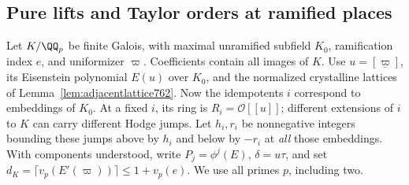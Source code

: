 \documentclass[a4paper,11pt]{article}
\theoremstyle{definition}
\theoremstyle{remark}
\numberwithin{equation}{section}
\begin{document}
\subsection{Pure lifts and Taylor orders at ramified places}
\label{sec:ramifiedorders782}
Let \(K/\QQ_p\) be finite Galois, with maximal unramified
subfield \(K_0\), ramification index \(e\), and uniformizer
\(\varpi\). Coefficients contain all images of \(K\).
Use \(u=[\underline\varpi]\), its Eisenstein polynomial
\(E(u)\) over \(K_0\), and the normalized crystalline
lattices of Lemma~\ref{lem:adjacentlattice762}. Now the
idempotents \(i\) correspond to embeddings of \(K_0\).
At a fixed \(i\), its ring is \(R_i=\mathcal O[[u]]\);
different extensions of \(i\) to \(K\) can carry different
Hodge jumps. Let \(h_i,r_i\) be nonnegative integers
bounding these jumps above by \(h_i\) and below by \(-r_i\)
at \emph{all} those embeddings. With components understood,
write \(P_j=\phi^j(E)\), \(\delta=u\tau\), and set
\(d_K=\lceil v_p(E'(\varpi))\rceil\le1+v_p(e)\).
We use all primes \(p\), including two.
\end{document}
